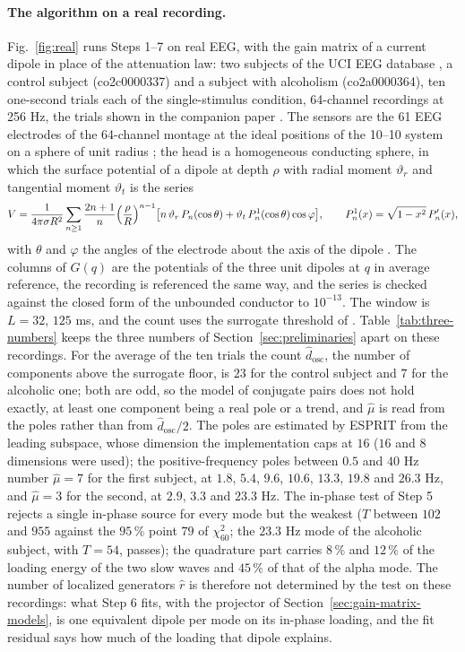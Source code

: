 \documentclass{article}
\begin{document}
\paragraph{The algorithm on a real recording.} Fig.~\ref{fig:real} runs Steps 1--7 on real EEG, with the gain matrix of a current dipole in place of the attenuation law: two subjects of the UCI EEG database \cite{ref-UCI, ref-Zhang95}, a control subject (co2c0000337) and a subject with alcoholism (co2a0000364), ten one-second trials each of the single-stimulus condition, 64-channel recordings at 256 Hz, the trials shown in the companion paper \cite{ref-companionA}. The sensors are the 61 EEG electrodes of the 64-channel montage at the ideal positions of the 10--10 system on a sphere of unit radius \cite{ref-Oostenveld}; the head is a homogeneous conducting sphere, in which the surface potential of a dipole at depth $\rho$ with radial moment $\vartheta_r$ and tangential moment $\vartheta_t$ is the series
\[
V = \frac{1}{4\pi\sigma R^{2}} \sum_{n \ge 1} \frac{2n + 1}{n} \Bigl(\frac{\rho}{R}\Bigr)^{n - 1} \bigl[ n\,\vartheta_r\, P_n(\cos\theta) + \vartheta_t\, P_n^{1}(\cos\theta) \cos\varphi \bigr], \qquad P_n^{1}(x) = \sqrt{1 - x^{2}}\, P_n'(x),
\]
with $\theta$ and $\varphi$ the angles of the electrode about the axis of the dipole \cite{ref-Mosher}. The columns of $G(q)$ are the potentials of the three unit dipoles at $q$ in average reference, the recording is referenced the same way, and the series is checked against the closed form of the unbounded conductor to $10^{-13}$. The window is $L = 32$, $125$ ms, and the count uses the surrogate threshold of \cite{ref-companionA}. Table~\ref{tab:three-numbers} keeps the three numbers of Section~\ref{sec:preliminaries} apart on these recordings. For the average of the ten trials the count $\widehat{d}_{\mathrm{osc}}$, the number of components above the surrogate floor, is $23$ for the control subject and $7$ for the alcoholic one; both are odd, so the model of conjugate pairs does not hold exactly, at least one component being a real pole or a trend, and $\widehat{\mu}$ is read from the poles rather than from $\widehat{d}_{\mathrm{osc}}/2$. The poles are estimated by ESPRIT from the leading subspace, whose dimension the implementation caps at $16$ ($16$ and $8$ dimensions were used); the positive-frequency poles between $0.5$ and $40$ Hz number $\widehat{\mu} = 7$ for the first subject, at $1.8$, $5.4$, $9.6$, $10.6$, $13.3$, $19.8$ and $26.3$ Hz, and $\widehat{\mu} = 3$ for the second, at $2.9$, $3.3$ and $23.3$ Hz. The in-phase test of Step 5 rejects a single in-phase source for every mode but the weakest ($T$ between $102$ and $955$ against the $95\,\%$ point $79$ of $\chi^{2}_{60}$; the $23.3$ Hz mode of the alcoholic subject, with $T = 54$, passes); the quadrature part carries $8\,\%$ and $12\,\%$ of the loading energy of the two slow waves and $45\,\%$ of that of the alpha mode. The number of localized generators $\widehat{r}$ is therefore not determined by the test on these recordings: what Step 6 fits, with the projector of Section~\ref{sec:gain-matrix-models}, is one equivalent dipole per mode on its in-phase loading, and the fit residual says how much of the loading that dipole explains.
\end{document}
